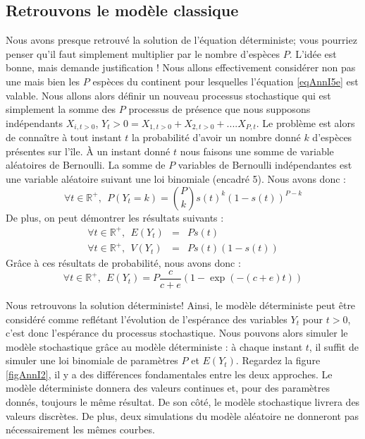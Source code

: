 \subsection*{Retrouvons le modèle classique}
Nous avons presque retrouvé la solution de l'équation déterministe; vous pourriez penser qu'il faut simplement multiplier par le nombre d'espèces $P$. L'idée est bonne, mais demande justification ! Nous allons effectivement considérer non pas une mais bien les $P$ espèces du continent pour lesquelles l'équation \eqref{eqAnnI5e} est valable. Nous allons alors définir un nouveau processus stochastique qui est simplement la somme des $P$ processus de présence que nous supposons indépendants $X_{i,t>0}$, $Y_t>0=X_{1,t>0}+X_{2,t>0}+....X_{P,t}$. Le problème est alors de connaître à tout instant $t$ la probabilité d'avoir un nombre donné $k$ d'espèces présentes sur l'île. À un instant donné $t$ nous faisons une somme de variable aléatoires de Bernoulli. La somme de $P$ variables de Bernoulli indépendantes est une variable aléatoire suivant une loi binomiale (encadré 5). Nous avons donc :
\begin{equation}
 \forall t \in \mathbb{R}^+, ~~\label{eqAnnI6a} P(Y_t=k)=\binom{P}{k}s(t)^k(1-s(t))^{P-k}
\end{equation}
De plus, on peut démontrer les résultats suivants :
\begin{eqnarray}
 \forall t \in \mathbb{R}^+, ~~\label{eqAnnI6b} E(Y_t)&=&Ps(t) \\
 \forall t \in \mathbb{R}^+, ~~\label{eqAnnI6c} V(Y_t)&=&Ps(t)(1-s(t))
\end{eqnarray}
Grâce à ces résultats de probabilité, nous avons donc :
\begin{equation}
 \forall t \in \mathbb{R}^+, ~~\label{eqAnnI6d} E(Y_t)=P\frac{c}{c+e}(1-\exp(-(c+e)t))
\end{equation}

Nous retrouvons la solution déterministe! Ainsi, le modèle déterministe peut être considéré comme reflétant l'évolution de l'espérance des variables $Y_t$ pour $t>0$, c'est donc l'espérance du processus stochastique. Nous pouvons alors simuler le modèle stochastique grâce au modèle déterministe : à chaque instant $t$, il suffit de simuler une loi binomiale de paramètres $P$ et $E(Y_t)$. Regardez la figure \ref{figAnnI2}, il y a des différences fondamentales entre les deux approches. Le modèle déterministe donnera des valeurs continues et, pour des paramètres donnés, toujours le même résultat. De son côté, le modèle stochastique livrera des valeurs discrètes. De plus, deux simulations du modèle aléatoire ne donneront pas nécessairement les mêmes courbes.

